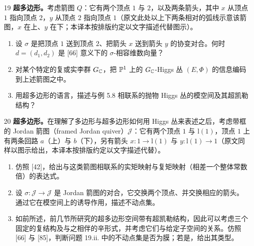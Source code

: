 \begin{prob}{19} \textbf{超多边形。}考虑箭图 $Q$：它有两个顶点 $1$ 与 $2$，以及两条箭头，其中 $x$ 从顶点 $1$ 指向顶点 $2$，$y$ 从顶点 $2$ 指向顶点 $1$（原文此处以上下两条相对的弧线示意该箭图，$x$ 在上、$y$ 在下；本译本按排版约定以文字描述代替图示）。
\begin{enumerate}[label=(\roman*),leftmargin=2.2em]
\item 设 $\sigma$ 是把顶点 $1$ 送到顶点 $2$、把箭头 $x$ 送到箭头 $y$ 的协变对合。何时 $d=(d_1,d_2)$ 是 [66] 意义下的 $\sigma$-相容维数向量？
\item 对某个特定的复或实李群 $G_{\mathbb{C}}$，把 $\mathbb{P}^{1}$ 上的 $G_{\mathbb{C}}$-Higgs 丛 $(E,\Phi)$ 的信息编码到上述箭图之中。
\item 用超多边形的语言，描述与例 5.8 相联系的抛物 Higgs 丛的模空间及其超凯勒结构？
\end{enumerate}
\end{prob}

\begin{prob}{20} \textbf{超多边形。}在理解了多边形与超多边形如何用 Higgs 丛来表述之后，考虑带框的 Jordan 箭图（framed Jordan quiver）$\mathcal{J}$：它有两个顶点 $1$ 与 $\mathrm{l}(1)$，顶点 $1$ 上有两条回路 $a$（上）与 $b$（下），另有箭头 $x:1\to\mathrm{l}(1)$ 与 $y:\mathrm{l}(1)\to 1$（原文同样以图示给出，本译本按排版约定以文字描述代替）。
\begin{enumerate}[label=(\roman*),leftmargin=2.2em]
\item 仿照 [42]，给出与这类箭图相联系的实矩映射与复矩映射（相差一个整体常数倍）的表达式。
\item 设 $\sigma:\mathcal{J}\to\mathcal{J}$ 是 Jordan 箭图的对合，它交换两个顶点、并交换相应的箭头。通过它在模空间上的诱导作用，描述不动点集。
\item 如前所述，前几节所研究的超多边形空间带有超凯勒结构，因此可以考虑三个固定的复结构及与之相伴的辛形式，并考虑它们与给定子空间的关系。仿照 [66] 与 [85]，判断问题 19.ii. 中的不动点集是否为膜；若是，给出其类型。
\end{enumerate}
\end{prob}
